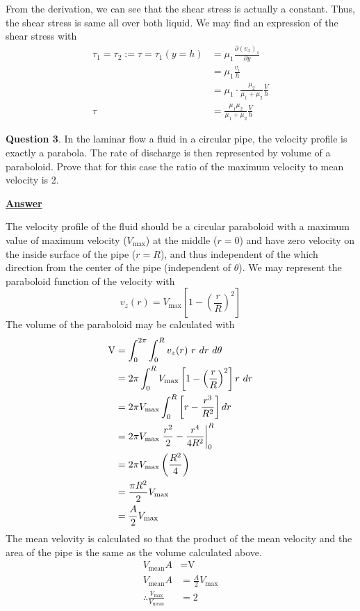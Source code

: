 \documentclass[10pt]{article}
\begin{document}
From the derivation, we can see that the shear stress is actually a constant. Thus, the shear stress is same all over both liquid. We may find an expression of the shear stress with
\begin{align*}
    \tau_1 = \tau_2 := \tau = \tau_1 (y = h) &= \mu_1 \frac{\partial (v_x)_1}{\partial y} \\
    &= \mu_1 \frac{v_i}{h} \\
    &= \mu_1 \cdot \frac{\mu_2}{\mu_1 + \mu_2} \frac{V}{h} \\
    \tau &= \frac{\mu_1 \mu_2}{\mu_1 + \mu_2} \frac{V}{h}
\end{align*}

\break

\textbf{Question 3}. In the laminar flow a fluid in a circular pipe, the velocity profile is exactly a parabola. The rate of discharge is then represented by volume of a paraboloid. Prove that for this case the ratio of the maximum velocity to mean velocity is 2.

\hfill

\textbf{\underline{Answer}}


The velocity profile of the fluid should be a circular paraboloid with a maximum value of maximum velocity ($V_{\textrm{max}}$) at the middle ($r = 0$) and have zero velocity on the inside surface of the pipe ($r = R$), and thus independent of the which direction from the center of the pipe (independent of $\theta$). We may represent the paraboloid function of the velocity with
\begin{equation}
    v_z(r) = V_{\textrm{max}} \left[1 - \left(\frac{r}{R}\right)^2\right]
\end{equation}
The volume of the paraboloid may be calculated with
\begin{align*}
    \textrm{V} &= \int_0^{2\pi} \int_0^R v_z(r)\ r\ dr\ d\theta \\
    &= 2\pi \int_0^R V_{\textrm{max}} \left[1 - \left(\frac{r}{R}\right)^2\right]r\ dr \\
    &= 2\pi V_{\textrm{max}} \int_0^R \left[r - \frac{r^3}{R^2}\right] dr \\
    &= 2\pi V_{\textrm{max}} \eval*{\frac{r^2}{2} - \frac{r^4}{4R^2}}_{0}^{R} \\
    &= 2\pi V_{\textrm{max}} \left(\frac{R^2}{4}\right) \\
    &= \frac{\pi R^2}{2} V_{\textrm{max}} \\
    &= \frac{A}{2} V_{\textrm{max}}
\end{align*}
The mean velovity is calculated so that the product of the mean velocity and the area of the pipe is the same as the volume calculated above.
\begin{align*}
    V_{\textrm{mean}} A &= \textrm{V} \\
    V_{\textrm{mean}} A &= \frac{A}{2} V_{\textrm{max}} \\
    \therefore \frac{V_{\textrm{max}}}{V_{\textrm{mean}}} &= 2
\end{align*}
\end{document}
